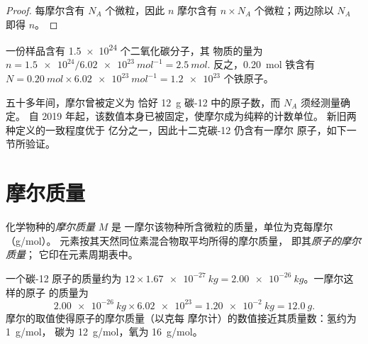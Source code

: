 \begin{proof}
每摩尔含有 $N_A$ 个微粒，因此 $n$ 摩尔含有 $n \times N_A$
个微粒；两边除以 $N_A$ 即得 $n$。
\end{proof}

\begin{example}[分子与摩尔]\label{ex:g10:the-mole:convert}
一份样品含有 \num{1.5e24} 个二氧化碳分子，其
物质的量为
$n = \num{1.5e24} / \qty{6.02e23}{mol^{-1}} = \qty{2.5}{mol}$.
反之，\qty{0.20}{mol} 铁含有
$N = \qty{0.20}{mol} \times \qty{6.02e23}{mol^{-1}} = \num{1.2e23}$
个铁原子。
\end{example}

\begin{remark}[数值的来源]\label{rem:g10:the-mole:origin}
五十多年间，摩尔曾被定义为
恰好 \qty{12}{g} 碳-12 中的原子数，而 $N_A$ 须经测量确定。
自 2019 年起，该数值本身已被固定，使摩尔成为纯粹的计数单位。
新旧两种定义的一致程度优于
亿分之一，因此十二克碳-12 仍含有一摩尔
原子，如下一节所验证。
\end{remark}

\section{摩尔质量}

\begin{definition}[摩尔质量]\label{def:g10:the-mole:molar-mass}
化学物种的\emph{摩尔质量} $M$ 是
一摩尔该物种所含微粒的质量，单位为克每摩尔（\si{g/mol}）。
元素按其天然同位素混合物取平均所得的摩尔质量，
即其\emph{原子的摩尔质量}；
它印在元素周期表中。
\end{definition}

\begin{example}[一摩尔碳原子]\label{ex:g10:the-mole:carbon}
一个碳-12 原子的质量约为
$12 \times \qty{1.67e-27}{kg} = \qty{2.00e-26}{kg}$。一摩尔这样的原子
的质量为
\[
  \qty{2.00e-26}{kg} \times \num{6.02e23} = \qty{1.20e-2}{kg}
  = \qty{12.0}{g}.
\]
摩尔的取值使得原子的摩尔质量（以克每
摩尔计）的数值接近其质量数：氢约为 \qty{1}{g/mol}，
碳为 \qty{12}{g/mol}，氧为 \qty{16}{g/mol}。
\end{example}

